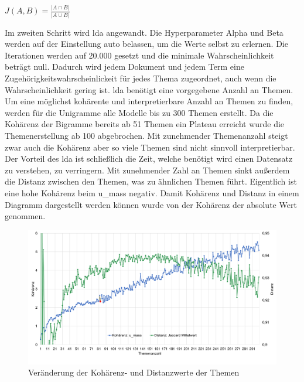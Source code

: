 \begin{center}
	$J(A,B) = \frac{\left|A \cap B\right|}{\left|A \cup B\right|}$ 
\end{center}


Im zweiten Schritt wird \gls{lda} angewandt. Die Hyperparameter Alpha und Beta werden auf der Einstellung auto belassen, um die Werte selbst zu erlernen. Die Iterationen werden auf 20.000 gesetzt und die minimale Wahrscheinlichkeit beträgt null. Dadurch wird jedem Dokument und jedem Term eine Zugehörigkeitswahrscheinlickeit für jedes Thema zugeordnet, auch wenn die Wahrscheinlichkeit gering ist. \gls{lda} benötigt eine vorgegebene Anzahl an Themen. Um eine möglichst kohärente und interpretierbare Anzahl an Themen zu finden, werden für die Unigramme alle Modelle bis zu 300 Themen erstellt. Da die Kohärenz der Bigramme bereits ab 51 Themen ein Plateau erreicht wurde die Themenerstellung ab 100 abgebrochen. Mit zunehmender Themenanzahl steigt zwar auch die Kohärenz aber so viele Themen sind nicht sinnvoll interpretierbar. Der Vorteil des \gls{lda} ist schließlich die Zeit, welche benötigt wird einen Datensatz zu verstehen, zu verringern. Mit zunehmender Zahl an Themen sinkt außerdem die Distanz zwischen den Themen, was zu ähnlichen Themen führt. Eigentlich ist eine hohe Kohärenz beim u\_mass negativ. Damit Kohärenz und Distanz in einem Diagramm dargestellt werden können wurde von der Kohärenz der absolute Wert genommen.

\begin{landscape}
\begin{figure}
	\centering
	\includegraphics[width=\textwidth,keepaspectratio=true]{img/coherenceAndDistanceUnigram.png}
	\caption{
		Veränderung der Kohärenz- und Distanzwerte der Themen
	}
	\label{fig:Kohärenz_Distanz_Unigramme}
\end{figure}
\end{landscape}


